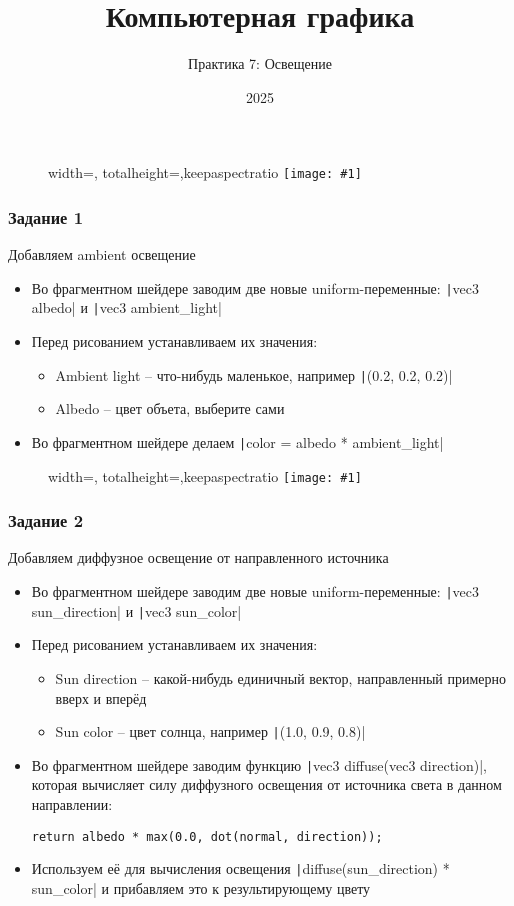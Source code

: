 \documentclass[10pt]{beamer}
\title{Компьютерная графика}
\subtitle{Практика 7: Освещение}
\date{2025}
\newcommand{\slideimage}[1]{
  \begin{figure}
    \begin{adjustbox}{width=\textwidth, totalheight=\textheight-2\baselineskip-2\baselineskip,keepaspectratio}
      \texttt{[image: \#1]}
    \end{adjustbox}
  \end{figure}
}
\begin{document}
\frame{\titlepage}

\begin{frame}[fragile]
\slideimage{0.png}
\end{frame}

\begin{frame}[fragile]
\frametitle{Задание 1}
Добавляем ambient освещение
\begin{itemize}
\item Во фрагментном шейдере заводим две новые uniform-переменные: \texttt|vec3 albedo| и \texttt|vec3 ambient_light|
\item Перед рисованием устанавливаем их значения:
\begin{itemize}
\item Ambient light -- что-нибудь маленькое, например \texttt|(0.2, 0.2, 0.2)|
\item Albedo -- цвет объета, выберите сами
\end{itemize}
\item Во фрагментном шейдере делаем \texttt|color = albedo * ambient_light|
\end{itemize}
\end{frame}

\begin{frame}[fragile]
\slideimage{1.png}
\end{frame}

\begin{frame}[fragile]
\frametitle{Задание 2}
Добавляем диффузное освещение от направленного источника
\begin{itemize}
\item Во фрагментном шейдере заводим две новые uniform-переменные: \texttt|vec3 sun_direction| и \texttt|vec3 sun_color|
\item Перед рисованием устанавливаем их значения:
\begin{itemize}
\item Sun direction -- какой-нибудь единичный вектор, направленный примерно вверх и вперёд
\item Sun color -- цвет солнца, например \texttt|(1.0, 0.9, 0.8)|
\end{itemize}
\item Во фрагментном шейдере заводим функцию \texttt|vec3 diffuse(vec3 direction)|, которая вычисляет силу диффузного освещения от источника света в данном направлении:
\begin{verbatim}
return albedo * max(0.0, dot(normal, direction));
\end{verbatim}
\item Используем её для вычисления освещения \texttt|diffuse(sun_direction) * sun_color| и прибавляем это к результирующему цвету
\end{itemize}
\end{frame}
\end{document}
